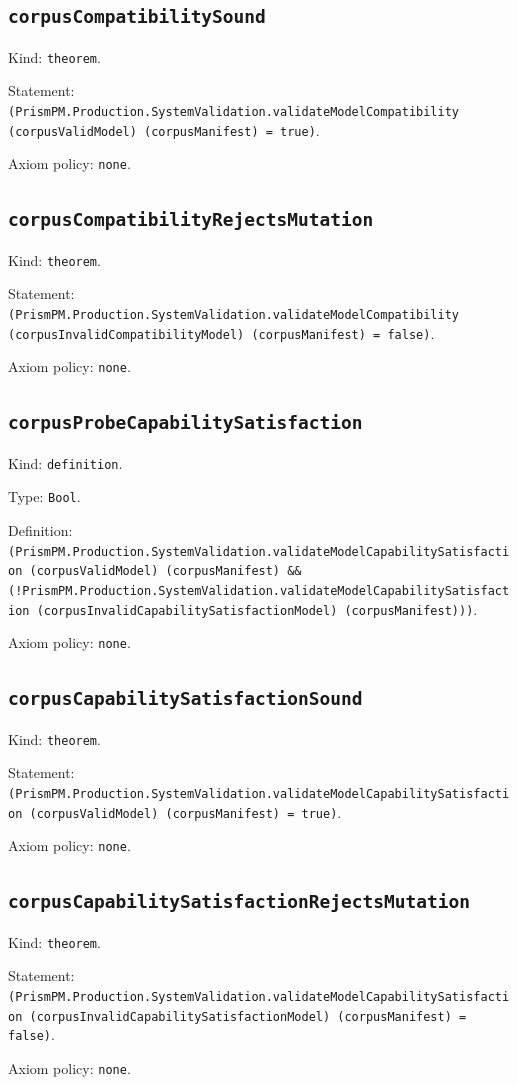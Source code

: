 \documentclass[11pt]{article}
\begin{document}
\subsection*{\texttt{corpusCompatibilitySound}}
\noindent Kind: \texttt{theorem}.\par
\noindent Statement: \texttt{(PrismPM.Production.SystemValidation.validateModelCompatibility (corpusValidModel) (corpusManifest) = true)}.\par
\noindent Axiom policy: \texttt{none}.\par
\subsection*{\texttt{corpusCompatibilityRejectsMutation}}
\noindent Kind: \texttt{theorem}.\par
\noindent Statement: \texttt{(PrismPM.Production.SystemValidation.validateModelCompatibility (corpusInvalidCompatibilityModel) (corpusManifest) = false)}.\par
\noindent Axiom policy: \texttt{none}.\par
\subsection*{\texttt{corpusProbeCapabilitySatisfaction}}
\noindent Kind: \texttt{definition}.\par
\noindent Type: \texttt{Bool}.\par
\noindent Definition: \texttt{(PrismPM.Production.SystemValidation.validateModelCapabilitySatisfaction (corpusValidModel) (corpusManifest) \&\& (!PrismPM.Production.SystemValidation.validateModelCapabilitySatisfaction (corpusInvalidCapabilitySatisfactionModel) (corpusManifest)))}.\par
\noindent Axiom policy: \texttt{none}.\par
\subsection*{\texttt{corpusCapabilitySatisfactionSound}}
\noindent Kind: \texttt{theorem}.\par
\noindent Statement: \texttt{(PrismPM.Production.SystemValidation.validateModelCapabilitySatisfaction (corpusValidModel) (corpusManifest) = true)}.\par
\noindent Axiom policy: \texttt{none}.\par
\subsection*{\texttt{corpusCapabilitySatisfactionRejectsMutation}}
\noindent Kind: \texttt{theorem}.\par
\noindent Statement: \texttt{(PrismPM.Production.SystemValidation.validateModelCapabilitySatisfaction (corpusInvalidCapabilitySatisfactionModel) (corpusManifest) = false)}.\par
\noindent Axiom policy: \texttt{none}.\par
\end{document}
